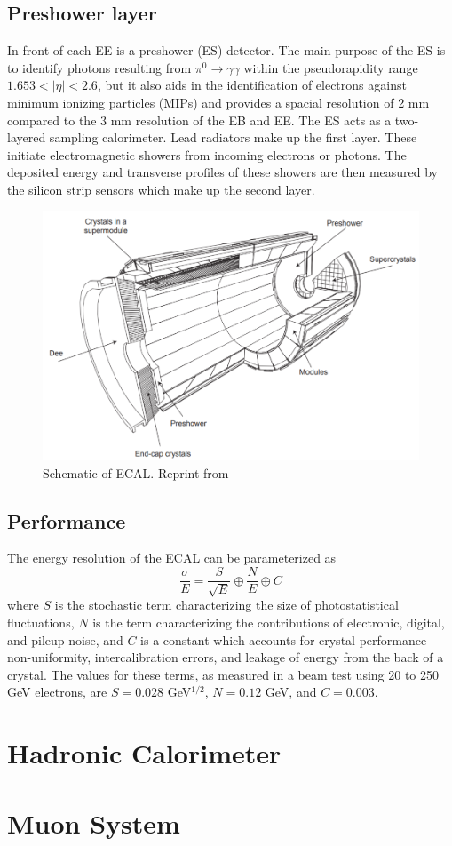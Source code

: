 \subsection{Preshower layer}
In front of each EE is a preshower (ES) detector.  The main purpose of the ES is to identify photons resulting from $\pi^{0}\rightarrow \gamma \gamma$ within the pseudorapidity range $1.653 < |\eta| < 2.6$, but it also aids in the identification of electrons against minimum ionizing particles (MIPs) and provides a spacial resolution of 2 mm compared to the 3 mm resolution of the EB and EE.  The ES acts as a two-layered sampling calorimeter.  Lead radiators make up the first layer.   These initiate electromagnetic showers from incoming electrons or photons.  The deposited energy and transverse profiles of these showers are then measured by the silicon strip sensors which make up the second layer.  

\begin{figure}[h]
	\centering
	\includegraphics[width=0.7\linewidth]{Figures/ECAL_layout}
	\caption{Schematic of ECAL. Reprint from \cite{Collaboration_2008}}
	\label{fig:ecallayout}
\end{figure}

\subsection{Performance}
The energy resolution of the ECAL can be parameterized as 
\begin{equation}
\frac{\sigma}{E} = \frac{S}{\sqrt{E}} \oplus \frac{N}{E} \oplus C
\end{equation}
where $S$ is the stochastic term characterizing the size of photostatistical fluctuations, $N$ is the term characterizing the contributions of electronic, digital, and pileup noise, and $C$ is a constant which accounts for crystal performance non-uniformity, intercalibration errors, and leakage of energy from the back of a crystal.  The values for these terms, as measured in a beam test using 20 to 250 GeV electrons, are $S=0.028$ GeV$^{1/2}$, $N=0.12$ GeV, and $C=0.003$.  \cite{Collaboration_2008}


\section{Hadronic Calorimeter}

\section{Muon System}

